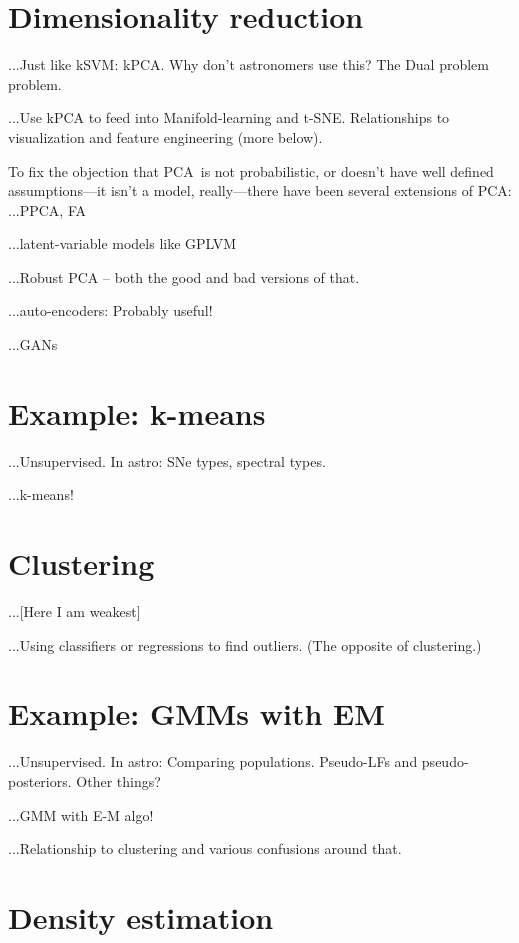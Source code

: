 \documentclass[12pt, letterpaper]{article}
\newcommand{\acronym}[1]{{\small{#1}}}
\newcommand{\PCA}{\acronym{PCA}}
\begin{document}
\section{Dimensionality reduction}

...Just like kSVM: kPCA. Why don't astronomers use this? The Dual problem problem.

...Use kPCA to feed into Manifold-learning and t-SNE.
Relationships to visualization and feature engineering (more below).

To fix the objection that \PCA\ is not probabilistic, or doesn't have well
defined assumptions---it isn't a model, really---there have been several
extensions of \PCA:
...PPCA, FA

...latent-variable models like GPLVM

...Robust PCA -- both the good and bad versions of that.

...auto-encoders: Probably useful!

...GANs

\section{Example: k-means}

...Unsupervised. In astro: SNe types, spectral types.

...k-means!

\section{Clustering}

...[Here I am weakest]

...Using classifiers or regressions to find outliers. (The opposite of clustering.)

\section{Example: GMMs with EM}

...Unsupervised. In astro: Comparing populations. Pseudo-LFs and pseudo-posteriors. Other things?

...GMM with E-M algo!

...Relationship to clustering and various confusions around that.

\section{Density estimation}
\end{document}
